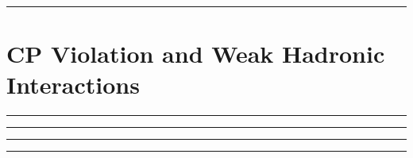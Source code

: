 
\noindent\rule{7in}{2.8pt}
\section{CP Violation and Weak Hadronic Interactions}
    
\begin{problem}{14.0}

\end{problem}

\begin{solution}


\end{solution}

\noindent\rule{7in}{1.5pt}


\begin{problem}{14.1}

\end{problem}

\begin{solution}


\end{solution}

\noindent\rule{7in}{1.5pt}


\begin{problem}{14.2}

\end{problem}

\begin{solution}


\end{solution}

\noindent\rule{7in}{1.5pt}


\begin{problem}{14.3}

\end{problem}

\begin{solution}


\end{solution}

\noindent\rule{7in}{1.5pt}

